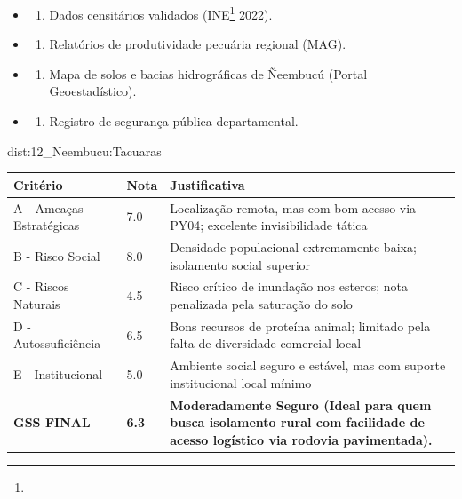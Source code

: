 {\begin{itemize}
\tightlist
\item
  \begin{enumerate}
  \def\labelenumi{\arabic{enumi})}
  \tightlist
  \item
    Dados censitários validados (INE\footnote{\fineINE} 2022).
  \end{enumerate}
\item
  \begin{enumerate}
  \def\labelenumi{\arabic{enumi})}
  \setcounter{enumi}{1}
  \tightlist
  \item
    Relatórios de produtividade pecuária regional (MAG).
  \end{enumerate}
\item
  \begin{enumerate}
  \def\labelenumi{\arabic{enumi})}
  \setcounter{enumi}{2}
  \tightlist
  \item
    Mapa de solos e bacias hidrográficas de Ñeembucú (Portal
    Geoestadístico).
  \end{enumerate}
\item
  \begin{enumerate}
  \def\labelenumi{\arabic{enumi})}
  \setcounter{enumi}{3}
  \tightlist
  \item
    Registro de segurança pública departamental.
  \end{enumerate}
\end{itemize}}{dist:12_Neembucu:Tacuaras}
\begin{table}[ht!]
\small \begin{tabular}{p{3.0cm}p{0.8cm}p{6.0cm}} \toprule
\textbf{Critério} & \textbf{Nota} & \textbf{Justificativa} \\ \midrule
A - Ameaças Estratégicas & 7.0 & Localização remota, mas com bom acesso via PY04; excelente invisibilidade tática \\
B - Risco Social & 8.0 & Densidade populacional extremamente baixa; isolamento social superior \\
C - Riscos Naturais & 4.5 & Risco crítico de inundação nos esteros; nota penalizada pela saturação do solo \\
D - Autossuficiência & 6.5 & Bons recursos de proteína animal; limitado pela falta de diversidade comercial local \\
E - Institucional & 5.0 & Ambiente social seguro e estável, mas com suporte institucional local mínimo \\
\midrule \textbf{GSS FINAL} & \textbf{6.3} & \textbf{Moderadamente Seguro (Ideal para quem busca isolamento rural com facilidade de acesso logístico via rodovia pavimentada).} \\ \bottomrule \end{tabular}
\end{table}
